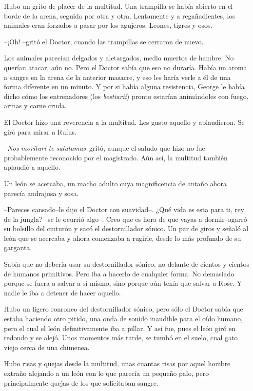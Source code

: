 Hubo un grito de placer de la multitud. Una trampilla se había abierto
en el borde de la arena, seguida por otra y otra. Lentamente y a
regañadientes, los animales eran forzados a pasar por los agujeros.
Leones, tigres y osos.

--¡Oh! --gritó el Doctor, cuando las trampillas se cerraron de nuevo.

Los animales parecían delgados y aletargados, medio muertos de hambre.
No querían atacar, aún no. Pero el Doctor sabía que eso no duraría.
Había un aroma a sangre en la arena de la anterior masacre, y eso les
haría verle a él de una forma diferente en un minuto. Y por si había
alguna resistencia, George le había dicho cómo los entrenadores (los
\emph{bestiarii}) pronto estarían animándoles con fuego, armas y carne
cruda.

El Doctor hizo una reverencia a la multitud. Les gusto aquello y
aplaudieron. Se giró para mirar a Rufus.

--\emph{Nos morituri te salutamus}--gritó, aunque el saludo que hizo no
fue probablemente reconocido por el magistrado. Aún así, la multitud
también aplaudió a aquello.

Un león se acercaba, un macho adulto cuya magnificencia de antaño ahora
parecía andrajosa y sosa.

--Pareces cansado--le dijo el Doctor con suavidad--. ¿Qué vida es esta
para ti, rey de la jungla? --se le ocurrió algo--. Creo que es hora de
que vayas a dormir--agarró su bolsillo del cinturón y sacó el
destornillador sónico. Un par de giros y señaló al león que se acercaba
y ahora comenzaba a rugirle, desde lo más profundo de su garganta.

Sabía que no debería usar su destornillador sónico, no delante de
cientos y cientos de humanos primitivos. Pero iba a hacerlo de cualquier
forma. No demasiado porque se fuera a salvar a sí mismo, sino porque aún
tenía que salvar a Rose. Y nadie le iba a detener de hacer aquello.

Hubo un ligero ronroneo del destornillador sónico, pero sólo el Doctor
sabía que estaba haciendo otro pitido, una onda de sonido inaudible para
el oído humano, pero el cual el león definitivamente iba a pillar. Y así
fue, pues el león giró en redondo y se alejó. Unos momentos más tarde,
se tumbó en el suelo, cual gato viejo cerca de una chimenea.

Hubo risas y quejas desde la multitud, unas cuantas risas por aquel
hombre extraño alejando a un león con lo que parecía un pequeño palo,
pero principalmente quejas de los que solicitaban sangre.

